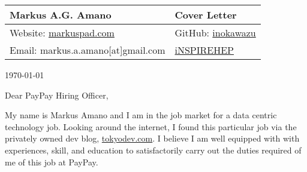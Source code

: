 \documentclass[fontsize=12pt]{article}
\begin{document}
\begin{center}
  \begin{tabularx}{\textwidth} { 
      >{\raggedright\arraybackslash}X 
    >{\raggedleft\arraybackslash}X  }
    \huge Markus A.G. Amano & Cover Letter\\
    \hline
    Website: \href{https://markuspad.com/}{markuspad.com}& 
    GitHub: \href{https://github.com/inokawazu}{inokawazu}\\
    Email: markus.a.amano[at]gmail.com & \href{https://inspirehep.net/authors/1778034}{iNSPIREHEP}\\
  \end{tabularx}
\end{center}

\today

Dear PayPay Hiring Officer,

My name is Markus Amano and I am in the job market for a data centric technology job.
Looking around the internet, I found this particular job via the privately owned
dev blog, \url{tokyodev.com}.
I believe I am well equipped with with experiences, skill, and education to satisfactorily 
carry out the duties required of me of this job at PayPay.
\end{document}
